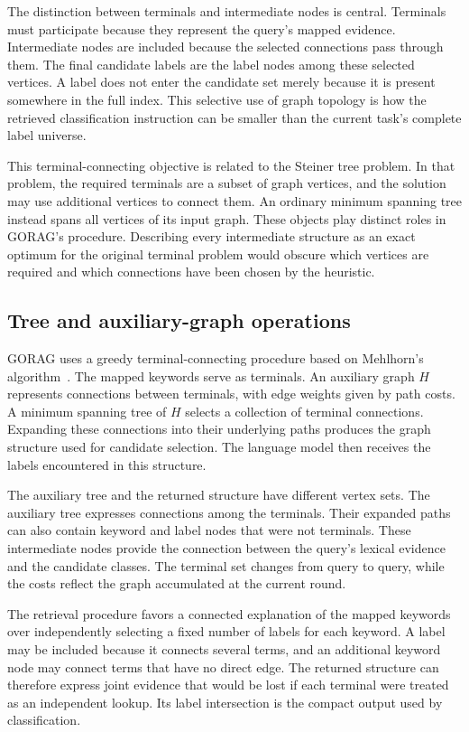 The distinction between terminals and intermediate nodes is central. Terminals must participate because they represent the query's mapped evidence. Intermediate nodes are included because the selected connections pass through them. The final candidate labels are the label nodes among these selected vertices. A label does not enter the candidate set merely because it is present somewhere in the full index. This selective use of graph topology is how the retrieved classification instruction can be smaller than the current task's complete label universe.

This terminal-connecting objective is related to the Steiner tree problem. In that problem, the required terminals are a subset of graph vertices, and the solution may use additional vertices to connect them. An ordinary minimum spanning tree instead spans all vertices of its input graph. These objects play distinct roles in GORAG's procedure. Describing every intermediate structure as an exact optimum for the original terminal problem would obscure which vertices are required and which connections have been chosen by the heuristic.

\subsection{Tree and auxiliary-graph operations}
\label{sec:gorag:algorithm}

GORAG uses a greedy terminal-connecting procedure based on Mehlhorn's algorithm~\cite{gorag-mehlhorn1988faster}. The mapped keywords serve as terminals. An auxiliary graph $H$ represents connections between terminals, with edge weights given by path costs. A minimum spanning tree of $H$ selects a collection of terminal connections. Expanding these connections into their underlying paths produces the graph structure used for candidate selection. The language model then receives the labels encountered in this structure.

The auxiliary tree and the returned structure have different vertex sets. The auxiliary tree expresses connections among the terminals. Their expanded paths can also contain keyword and label nodes that were not terminals. These intermediate nodes provide the connection between the query's lexical evidence and the candidate classes. The terminal set changes from query to query, while the costs reflect the graph accumulated at the current round.

The retrieval procedure favors a connected explanation of the mapped keywords over independently selecting a fixed number of labels for each keyword. A label may be included because it connects several terms, and an additional keyword node may connect terms that have no direct edge. The returned structure can therefore express joint evidence that would be lost if each terminal were treated as an independent lookup. Its label intersection is the compact output used by classification.

